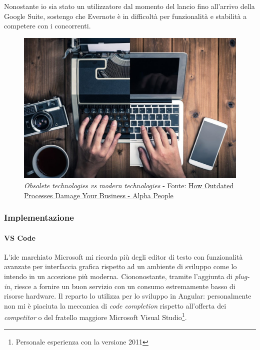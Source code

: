 Nonostante io sia stato un utilizzatore dal momento del lancio fino all'arrivo della Google Suite, sostengo che Evernote è in difficoltà per funzionalità e stabilità a competere con i concorrenti.
\vspace{20pt}
\begin{figure}[H]
    \centering
    \includegraphics[width=0.75\columnwidth]{immagini/outdated.jpeg}
    \caption{\textit{Obsolete technologies vs modern technologies} - Fonte: \href{https://alfapeople.com/outdated-processes-damage-business-part-1-obsolete-technologies/}{How Outdated Processes Damage Your Business - Alpha People}}
    \label{fig:oldTech}
\end{figure}
\newpage
\subsubsection{Implementazione}
\paragraph{VS Code}
L'\acrshort{ide} marchiato Microsoft mi ricorda più degli editor di testo con funzionalità avanzate per interfaccia grafica rispetto ad un ambiente di sviluppo come lo intendo in un accezione più moderna. Ciononostante, tramite l'aggiunta di \textit{plug-in}, riesce a fornire un buon servizio con un consumo estremamente basso di risorse hardware.
Il reparto lo utilizza per lo sviluppo in Angular: personalmente non mi è piaciuta la meccanica di \textit{code completion} rispetto all'offerta dei \textit{competitor} o del fratello maggiore Microsoft Visual Studio\footnote{Personale esperienza con la versione 2011}.
